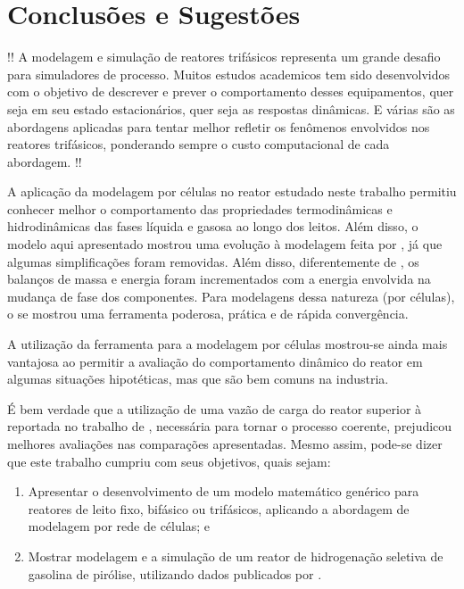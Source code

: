 %
% 
%
\chapter{Conclusões e Sugestões} \label{chap:conclusoes}
%

!! A modelagem e simulação de reatores trifásicos representa um grande
desafio para simuladores de processo. Muitos estudos academicos tem
sido desenvolvidos com o objetivo de descrever e prever o comportamento desses
equipamentos, quer seja em seu estado estacionários, quer seja as respostas
dinâmicas. E várias são as abordagens aplicadas para tentar melhor refletir os
fenômenos envolvidos nos reatores trifásicos, ponderando sempre o custo
computacional de cada abordagem. !!

A aplicação da modelagem por células no reator estudado neste trabalho permitiu
conhecer melhor o comportamento das propriedades termodinâmicas e hidrodinâmicas
das fases líquida e gasosa ao longo dos leitos. Além disso, o modelo aqui
apresentado mostrou uma evolução à modelagem feita por ,
já que algumas simplificações foram removidas. Além disso,
diferentemente de , os balanços de massa e energia foram
incrementados com a energia envolvida na mudança de fase dos componentes. Para
modelagens dessa natureza (por células), o \emso{} se mostrou uma ferramenta
poderosa, prática e de rápida convergência.

A utilização da ferramenta \emso{} para a modelagem por células mostrou-se
ainda mais vantajosa ao permitir a avaliação do comportamento dinâmico do reator
em algumas situações hipotéticas, mas que são bem comuns na industria.

É bem verdade que a utilização de uma vazão de carga do reator superior à
reportada no trabalho de , necessária para
tornar o processo coerente, prejudicou melhores avaliações nas comparações
apresentadas. Mesmo assim, pode-se dizer que este trabalho cumpriu
com seus objetivos, quais sejam:

\begin{enumerate}
  \item Apresentar o desenvolvimento de um modelo matemático genérico para
  reatores de leito fixo, bifásico ou trifásicos, aplicando a abordagem de
  modelagem por rede de células; e 
  \item Mostrar modelagem e a simulação de um reator de hidrogenação seletiva
  de gasolina de pirólise, utilizando dados publicados por
  .
\end{enumerate}

